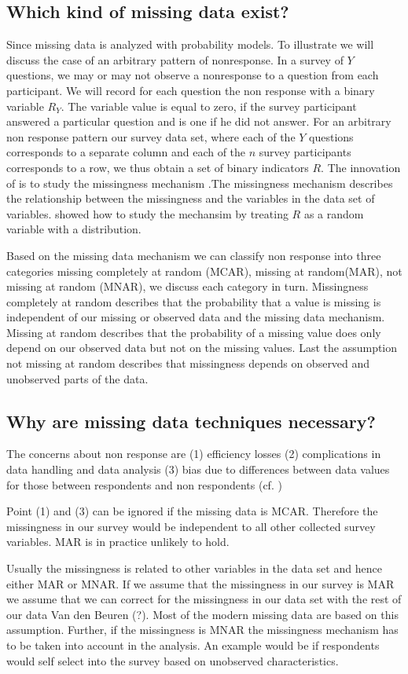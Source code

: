 \subsection{Which kind of missing data exist?} 
Since \cite{rubin1976} missing data is analyzed with probability models. 
To illustrate we will discuss the case of an arbitrary pattern of nonresponse.
In a survey of $Y$ questions, we may or may not observe a nonresponse to a question from each participant. 
We will record for each question the non response with a binary variable $R_Y$. 
The variable value is equal to zero, if the survey participant answered a particular question and is one if he did not answer. 
For an arbitrary non response pattern our  survey data set, where each of the $Y$ questions corresponds to a separate column and each of the $n$ survey participants corresponds to a row, we thus obtain a set of binary indicators $R$.
The innovation of \cite{rubin1976} is to study the missingness mechanism \cite{Little}.The missingness mechanism describes the relationship between the missingness and the variables in the data set of variables. \cite{rubin1976} showed how to study the mechansim by treating $R$ as a random variable with a distribution. \par
Based on the missing data mechanism we can classify non response into three categories missing completely at random (MCAR), missing at random(MAR),  not missing at random (MNAR), we discuss each category in turn.  Missingness completely at random describes that the probability that a value is missing is independent of our missing or observed data and the missing data mechanism. 
Missing at random describes that the probability of a missing value does only depend on our observed data but not on the missing values. 
Last the assumption not missing at random describes that missingness depends on observed and unobserved parts of the data. \par
\subsection{Why are missing data techniques necessary?}
The concerns about non response are (1) efficiency losses (2) complications in data handling and data analysis (3) bias due to differences between data values for those between respondents and non respondents (cf. \cite{Schafer99})
\par 
Point (1) and (3)  can be ignored if the missing data is MCAR. 
Therefore the missingness in our survey would be independent to all other collected survey variables. MAR is in practice unlikely to hold. \par 
Usually the missingness is related to other variables in the data set and hence either MAR or MNAR. 
If we assume that the missingness in our survey is  MAR we assume that we can correct for the missingness in our data set with the rest of our data Van den Beuren (?).  Most of the modern missing data are based on this assumption. Further, if the missingness is MNAR the missingness mechanism has to be taken into account in the analysis. An example would be if respondents would self select into the survey based on unobserved characteristics. 
